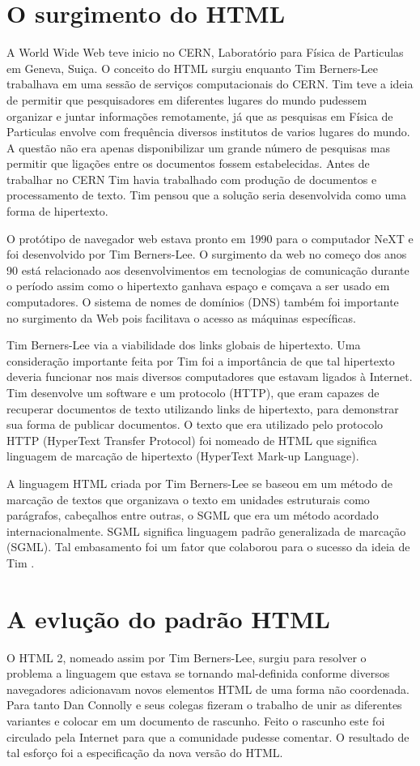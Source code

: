 \section{O surgimento do HTML}
A World Wide Web teve inicio no CERN, Laboratório para Física de Particulas em Geneva, Suiça. O conceito do HTML surgiu enquanto Tim Berners-Lee trabalhava em uma sessão de serviços computacionais do CERN. Tim teve a ideia de permitir que pesquisadores em diferentes lugares do mundo pudessem organizar e juntar informações remotamente, já que as pesquisas em Física de Particulas envolve com frequência diversos institutos de varios lugares do mundo. A questão não era apenas disponibilizar um grande número de pesquisas mas permitir que ligações entre os documentos fossem estabelecidas. Antes de trabalhar no CERN Tim havia trabalhado com produção de documentos e processamento de texto. Tim pensou que a solução seria desenvolvida como uma forma de hipertexto.

O protótipo de navegador web estava pronto em 1990 para o computador NeXT e foi desenvolvido por Tim Berners-Lee. O surgimento da web no começo dos anos 90 está relacionado aos desenvolvimentos em tecnologias de comunicação durante o período assim como o hipertexto ganhava espaço e comçava a ser usado em computadores. O sistema de nomes de domínios (DNS) também foi importante no surgimento da Web pois facilitava o acesso as máquinas específicas.

Tim Berners-Lee via a viabilidade dos links globais de hipertexto. Uma consideração importante feita por Tim foi a importância de que tal hipertexto deveria funcionar nos mais diversos computadores que estavam ligados à Internet. Tim desenvolve um software e um protocolo (HTTP), que eram capazes de recuperar documentos de texto utilizando links de hipertexto, para demonstrar sua forma de publicar documentos. O texto que era utilizado pelo protocolo HTTP (HyperText Transfer Protocol) foi nomeado de HTML que significa linguagem de marcação de hipertexto (HyperText Mark-up Language).

A linguagem HTML criada por Tim Berners-Lee se baseou em um método de marcação de textos que organizava o texto em unidades estruturais como parágrafos, cabeçalhos entre outras, o SGML que era um método acordado internacionalmente. SGML significa linguagem padrão generalizada de marcação (SGML). Tal embasamento foi um fator que colaborou para o sucesso da ideia de Tim \cite{htmlHist}.

\section{A evlução do padrão HTML}
O HTML 2, nomeado assim por Tim Berners-Lee, surgiu para resolver o problema a linguagem que estava se tornando mal-definida conforme diversos navegadores adicionavam novos elementos HTML de uma forma não coordenada. Para tanto Dan Connolly e seus colegas fizeram o trabalho de unir as diferentes variantes e colocar em um documento de rascunho. Feito o rascunho este foi circulado pela Internet para que a comunidade pudesse comentar. O resultado de tal esforço foi a especificação da nova versão do HTML.

